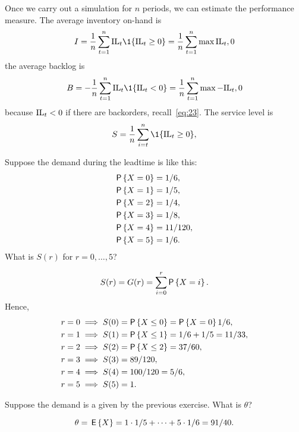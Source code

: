 Once we carry out a simulation for $n$ periods, we can estimate the
performance measure. The average  inventory on-hand is
\begin{equation}
  \label{eq:22}
  I = \frac 1n \sum_{t=1}^n \IL_t\1{\IL_t \geq 0} = \frac1n\sum_{t=1}^n \max{\IL_t, 0}
\end{equation}
the average backlog  is
\begin{equation}
  B = - \frac 1n \sum_{t=1}^n \IL_t\1{\IL_t < 0} = \frac1n\sum_{t=1}^n \max{-\IL_t, 0}
\end{equation}
because $\textrm{IL}_t<0$ if there are backorders, recall~\eqref{eq:23}. 
The service level is 
\begin{equation}
  \label{eq:22}
  S = \frac 1n \sum_{i=t}^n \1{\IL_t \geq 0},
\end{equation}

\begin{question}
  Suppose the demand during the leadtime is like this:
  \begin{align*}
    \P{X = 0} &= 1/6, \\
    \P{X = 1} &= 1/5, \\
    \P{X = 2} &= 1/4, \\
    \P{X = 3} &= 1/8, \\
    \P{X = 4} &= 11/120, \\
    \P{X = 5} &= 1/6.
  \end{align*}
What is $S(r)$ for $r=0, \ldots, 5$?
\end{question}
\begin{solution}
  \begin{equation*}
    S(r) = G(r) = \sum_{i=0}^r \P{X = i}.
  \end{equation*}
Hence,
\begin{align*}
  r &= 0 \implies S(0) = \P{X \leq 0} = \P{X=0}1/6, \\
  r &= 1 \implies S(1) = \P{X \leq 1} = 1/6 + 1/5 = 11/33, \\
  r &= 2 \implies S(2) = \P{X \leq 2} = 37/60,\\
  r &= 3 \implies S(3) = 89/120, \\
  r &= 4 \implies S(4) = 100/120 = 5/6, \\
  r &= 5 \implies S(5) = 1.
\end{align*}
\end{solution}

\begin{question}
Suppose the demand is a given by the previous exercise. What is $\theta$?
\end{question}
\begin{solution}
  \begin{equation*}
    \theta = \,\mathsf{E}\left\{X\right\} =
1\cdot 1/5 + \cdots + 5 \cdot 1/6 = 91/40.
  \end{equation*}
\end{solution}


